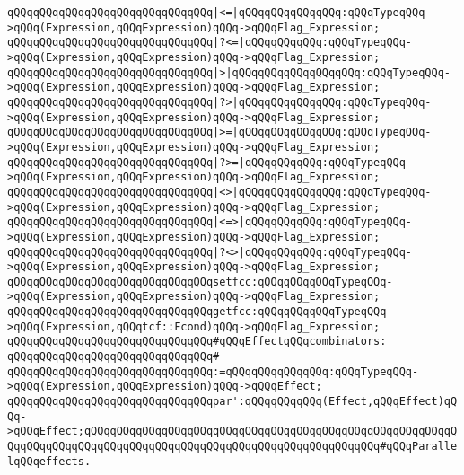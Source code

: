 \verb|qQQqqQQqqQQqqQQqqQQqqQQqqQQqqQQq|\verb#|<=|qQQqqQQqqQQqqQQq:qQQqTypeqQQq->qQQq(Expression,qQQqExpression)qQQq->qQQqFlag_Expression;#\newline
\verb|qQQqqQQqqQQqqQQqqQQqqQQqqQQqqQQq|\verb#|?<=|qQQqqQQqqQQq:qQQqTypeqQQq->qQQq(Expression,qQQqExpression)qQQq->qQQqFlag_Expression;#\newline
\verb|qQQqqQQqqQQqqQQqqQQqqQQqqQQqqQQq|\verb#|>|qQQqqQQqqQQqqQQqqQQq:qQQqTypeqQQq->qQQq(Expression,qQQqExpression)qQQq->qQQqFlag_Expression;#\newline
\verb|qQQqqQQqqQQqqQQqqQQqqQQqqQQqqQQq|\verb#|?>|qQQqqQQqqQQqqQQq:qQQqTypeqQQq->qQQq(Expression,qQQqExpression)qQQq->qQQqFlag_Expression;#\newline
\verb|qQQqqQQqqQQqqQQqqQQqqQQqqQQqqQQq|\verb#|>=|qQQqqQQqqQQqqQQq:qQQqTypeqQQq->qQQq(Expression,qQQqExpression)qQQq->qQQqFlag_Expression;#\newline
\verb|qQQqqQQqqQQqqQQqqQQqqQQqqQQqqQQq|\verb#|?>=|qQQqqQQqqQQq:qQQqTypeqQQq->qQQq(Expression,qQQqExpression)qQQq->qQQqFlag_Expression;#\newline
\verb|qQQqqQQqqQQqqQQqqQQqqQQqqQQqqQQq|\verb#|<>|qQQqqQQqqQQqqQQq:qQQqTypeqQQq->qQQq(Expression,qQQqExpression)qQQq->qQQqFlag_Expression;#\newline
\verb|qQQqqQQqqQQqqQQqqQQqqQQqqQQqqQQq|\verb#|<=>|qQQqqQQqqQQq:qQQqTypeqQQq->qQQq(Expression,qQQqExpression)qQQq->qQQqFlag_Expression;#\newline
\verb|qQQqqQQqqQQqqQQqqQQqqQQqqQQqqQQq|\verb#|?<>|qQQqqQQqqQQq:qQQqTypeqQQq->qQQq(Expression,qQQqExpression)qQQq->qQQqFlag_Expression;#\newline
\verb|qQQqqQQqqQQqqQQqqQQqqQQqqQQqqQQqsetfcc:qQQqqQQqqQQqTypeqQQq->qQQq(Expression,qQQqExpression)qQQq->qQQqFlag_Expression;|\newline
\verb|qQQqqQQqqQQqqQQqqQQqqQQqqQQqqQQqgetfcc:qQQqqQQqqQQqTypeqQQq->qQQq(Expression,qQQqtcf::Fcond)qQQq->qQQqFlag_Expression;|\newline
\newline
\verb|qQQqqQQqqQQqqQQqqQQqqQQqqQQqqQQq#qQQqEffectqQQqcombinators:|\newline
\verb|qQQqqQQqqQQqqQQqqQQqqQQqqQQqqQQq#|\newline
\verb|qQQqqQQqqQQqqQQqqQQqqQQqqQQqqQQq:=qQQqqQQqqQQqqQQq:qQQqTypeqQQq->qQQq(Expression,qQQqExpression)qQQq->qQQqEffect;|\newline
\verb|qQQqqQQqqQQqqQQqqQQqqQQqqQQqqQQqpar':qQQqqQQqqQQq(Effect,qQQqEffect)qQQq->qQQqEffect;qQQqqQQqqQQqqQQqqQQqqQQqqQQqqQQqqQQqqQQqqQQqqQQqqQQqqQQqqQQqqQQqqQQqqQQqqQQqqQQqqQQqqQQqqQQqqQQqqQQqqQQqqQQqqQQqqQQq#qQQqParallelqQQqeffects.|\newline
